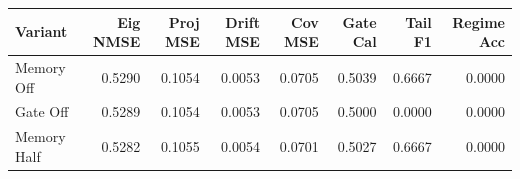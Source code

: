 \begin{tabular}{lrrrrrrr}
\toprule
Variant & Eig NMSE & Proj MSE & Drift MSE & Cov MSE & Gate Cal & Tail F1 & Regime Acc \\
\midrule
Memory Off & 0.5290 & 0.1054 & 0.0053 & 0.0705 & 0.5039 & 0.6667 & 0.0000 \\
Gate Off & 0.5289 & 0.1054 & 0.0053 & 0.0705 & 0.5000 & 0.0000 & 0.0000 \\
Memory Half & 0.5282 & 0.1055 & 0.0054 & 0.0701 & 0.5027 & 0.6667 & 0.0000 \\
\bottomrule
\end{tabular}